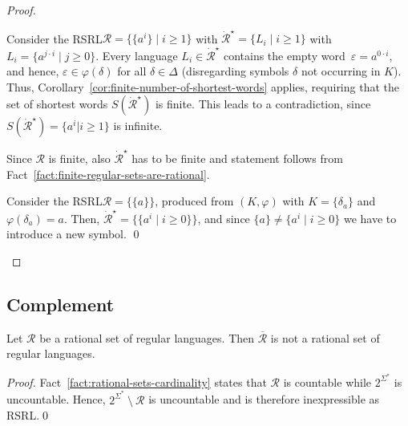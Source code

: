 \documentclass[envcountsame]{llncs}
\newcommand{\rationalset}{\ensuremath{\mathcal{R}}\xspace}
\newcommand{\RegularlyGeneratedLanguageSet}{rational set of regular languages\xspace}
\newcommand{\RegularlyGeneratedLanguageSetAbbrev}{RSRL\xspace}
\begin{document}
\begin{proof}
  \begin{inparaenum}[\bfseries(1)]
  \item Consider the \RegularlyGeneratedLanguageSetAbbrev $\rationalset = \{ \{ a^i \} \mid i
    \geq 1 \}$ with $\dot{\rationalset}^\star = \{ L_i \mid i \geq 1
    \}$ with $L_i=\{ a^{j \cdot i} \mid j \geq 0 \}$.
Every language $L_i \in \dot{\rationalset}^\star$ contains the
    empty word~$\varepsilon=a^{0 \cdot i}$, and hence,
    $\varepsilon\in\varphi(\delta)$ for all $\delta\in\Delta$
    (disregarding symbols $\delta$ not occurring in $K$).
Thus, Corollary~\ref{cor:finite-number-of-shortest-words} applies,
    requiring that the set of shortest words
    $S(\dot{\rationalset}^\star)$ is finite. 
This leads to a contradiction, since
    $S(\dot{\rationalset}^\star)=\{a^i|i\ge 1\}$ is infinite. 
\item Since $\rationalset$ is finite, also
    $\dot{\rationalset}^\star$ has to be finite and statement follows
    from Fact~\ref{fact:finite-regular-sets-are-rational}.
\item Consider the \RegularlyGeneratedLanguageSetAbbrev $\rationalset = \{\{a\}\}$, produced
    from $(K,\varphi)$ with $K=\{\delta_a\}$ and
    $\varphi(\delta_a)=a$.
Then, $\dot{\rationalset}^\star = \{\{ a^i \mid i \geq 0 \}\}$,
    and since $\{ a \} \neq \{ a^i \mid i \geq 0 \}$ we have to
    introduce a new symbol.  \qed
  \end{inparaenum}
\end{proof}




\subsection{Complement}
\label{sec:complement}


\begin{proposition}
  \label{prop:closure:complement}
  Let $\rationalset$ be a \RegularlyGeneratedLanguageSet.  Then $\overline{\rationalset}$
  is not a \RegularlyGeneratedLanguageSet.
\end{proposition}

\begin{proof}
  Fact~\ref{fact:rational-sets-cardinality} states that $\rationalset$
  is countable while $2^{\Sigma^*}$ is uncountable.
Hence, $2^{\Sigma^*}~\setminus~\rationalset$ is uncountable and is
  therefore inexpressible as \RegularlyGeneratedLanguageSetAbbrev.\qed
\end{proof}
\end{document}

